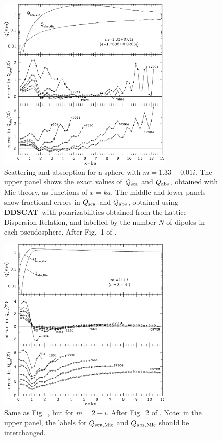 \begin{figure}[t]
\begin{center}
\vspace*{-0.9cm}
\includegraphics[width=8.3cm]{f1.png}
\vspace*{-2.2cm}
\caption{\footnotesize
        Scattering and absorption for a sphere with
	$m=1.33+0.01i$.  The upper panel shows the exact values of $Q_{\rm sca}$
	and $Q_{\rm abs}$, obtained with Mie theory, as functions of $x=ka$.
	The middle and lower panels show fractional errors in $Q_{\rm sca}$ and
	$Q_{\rm abs}$, obtained using {{\bf DDSCAT}}\ with polarizabilities obtained
	from the Lattice Dispersion Relation, and labelled by the number $N$
	of dipoles in each pseudosphere.
	After Fig.\ 1 of \citet{Draine+Flatau_1994}.}
	\label{fig:Qm=1.33+0.01i}
\end{center}
\end{figure}
\begin{figure}[h]
\begin{center}
\vspace*{-0.9cm}
\includegraphics[width=8.3cm]{f2.png}
\vspace*{-2.2cm}
\caption{\footnotesize
        Same as Fig.\ \protect{\ref{fig:Qm=1.33+0.01i}},
	but for $m=2+i$. After Fig.\ 2 of \citet{Draine+Flatau_1994}.
        Note: in the upper panel, the labels for $Q_{\rm sca,Mie}$ and
        $Q_{\rm abs,Mie}$ should be interchanged.}
	\label{fig:Qm=2+i}
\end{center}
\end{figure}
